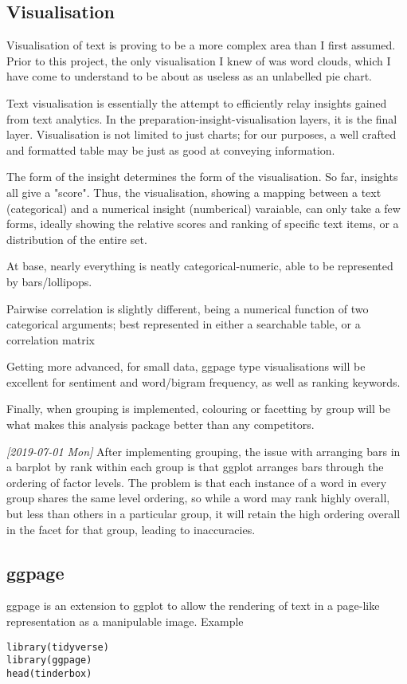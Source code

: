 \documentclass[a4paper, 11pt]{article}
\begin{document}
\subsection{Visualisation}
\label{sec:orged60518}
Visualisation of text is proving to be a more complex area than I
first assumed. Prior to this project, the only visualisation I knew of
was word clouds, which I have come to understand to be about as
useless as an unlabelled pie chart.

Text visualisation is essentially the attempt to efficiently relay
insights gained from text analytics. In the
preparation-insight-visualisation layers, it is the final layer.
Visualisation is not limited to just charts; for our purposes, a well
crafted and formatted table may be just as good at conveying
information.

The form of the insight determines the form of the visualisation. So
far, insights all give a "score". Thus, the visualisation, showing a
mapping between a text (categorical) and a numerical insight
(numberical) varaiable, can only take a few forms, ideally showing the
relative scores and ranking of specific text items, or a distribution
of the entire set.

At base, nearly everything is neatly categorical-numeric, able to be
represented by bars/lollipops.

Pairwise correlation is slightly different, being a numerical function
of two categorical arguments; best represented in either a searchable
table, or a correlation matrix

Getting more advanced, for small data, ggpage type visualisations will
be excellent for sentiment and word/bigram frequency, as well as
ranking keywords.

Finally, when grouping is implemented, colouring or facetting by group
will be what makes this analysis package better than any competitors.

\textit{[2019-07-01 Mon] } After implementing grouping, the issue with arranging
bars in a barplot by rank within each group is that ggplot arranges
bars through the ordering of factor levels. The problem is that each
instance of a word in every group shares the same level ordering, so
while a word may rank highly overall, but less than others in a
particular group, it will retain the high ordering overall in the
facet for that group, leading to inaccuracies.

\subsection{ggpage}
\label{sec:org3a3ee9a}
ggpage is an extension to ggplot to allow the rendering of text in a
page-like representation as a manipulable image. 
Example
\begin{verbatim}
library(tidyverse)
library(ggpage)
head(tinderbox)
\end{verbatim}
\end{document}

